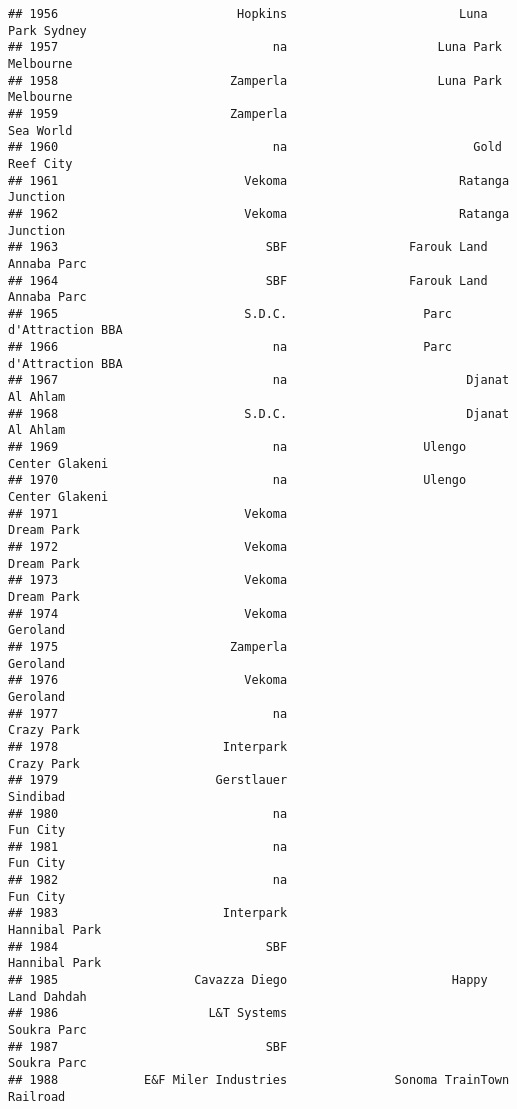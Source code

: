\documentclass[
]{article}
\begin{document}
\begin{verbatim}
## 1956                         Hopkins                        Luna Park Sydney
## 1957                              na                     Luna Park Melbourne
## 1958                        Zamperla                     Luna Park Melbourne
## 1959                        Zamperla                               Sea World
## 1960                              na                          Gold Reef City
## 1961                          Vekoma                        Ratanga Junction
## 1962                          Vekoma                        Ratanga Junction
## 1963                             SBF                 Farouk Land Annaba Parc
## 1964                             SBF                 Farouk Land Annaba Parc
## 1965                          S.D.C.                   Parc d'Attraction BBA
## 1966                              na                   Parc d'Attraction BBA
## 1967                              na                         Djanat Al Ahlam
## 1968                          S.D.C.                         Djanat Al Ahlam
## 1969                              na                   Ulengo Center Glakeni
## 1970                              na                   Ulengo Center Glakeni
## 1971                          Vekoma                              Dream Park
## 1972                          Vekoma                              Dream Park
## 1973                          Vekoma                              Dream Park
## 1974                          Vekoma                                Geroland
## 1975                        Zamperla                                Geroland
## 1976                          Vekoma                                Geroland
## 1977                              na                              Crazy Park
## 1978                       Interpark                              Crazy Park
## 1979                      Gerstlauer                                Sindibad
## 1980                              na                                Fun City
## 1981                              na                                Fun City
## 1982                              na                                Fun City
## 1983                       Interpark                           Hannibal Park
## 1984                             SBF                           Hannibal Park
## 1985                   Cavazza Diego                       Happy Land Dahdah
## 1986                     L&T Systems                             Soukra Parc
## 1987                             SBF                             Soukra Parc
## 1988            E&F Miler Industries               Sonoma TrainTown Railroad

\end{verbatim}
\end{document}
